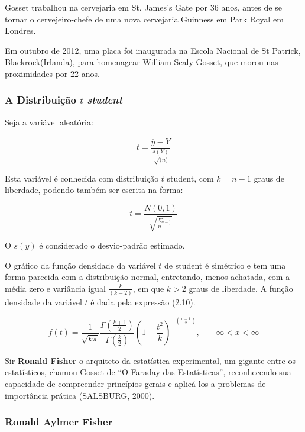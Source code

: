 Gosset trabalhou na cervejaria em St. James's Gate por 36 anos, antes de se tornar o cervejeiro-chefe de uma nova cervejaria Guinness em Park Royal em Londres.\vskip0.3cm

Em outubro de 2012, uma placa foi inaugurada na Escola Nacional de St Patrick, Blackrock(Irlanda), para homenagear William Sealy Gosset, que morou nas proximidades por 22 anos. \vskip0.3cm



\newpage
\subsubsection{A Distribuição $t$ \textit{student}}

Seja a variável aleatória:

\begin{equation}
    t =\frac{\overline{y}-\overline{Y}}{\frac{s(Y)}{\sqrt(n)}}
\end{equation}

Esta variável é conhecida com distribuição $t$ student, com $k=n-1$ graus de liberdade, podendo também ser escrita na forma:

\begin{equation}
    t =\frac{N(0,1)}{\sqrt{\frac{\chi^{2}_{n-1}}{n-1}}}
\end{equation}

O $s(y)$ é considerado o desvio-padrão estimado.\vskip0.3cm

O gráfico da função densidade da variável $t$ de student é simétrico e tem uma forma parecida com a distribuição normal, entretando, menos achatada, com a média zero e variância igual $\frac{k}{(k-2)}$, em que $k>2$ graus de liberdade. A função densidade da variável $t$ é dada pela expressão (2.10). 

\begin{equation}
f\left(t\right)=\frac{1}{\sqrt{k \pi}}\frac{\Gamma\left(\frac{k+1}{2}\right) }{\Gamma \left(\frac{k}{2}\right)}\left(1+\frac{t^2}{k}\right)^{-\left(\frac{\upsilon+1}{2}\right)},~~~-\infty<x<\infty
\end{equation}

Sir \textbf{Ronald Fisher} o arquiteto da estatística experimental, um gigante entre os estatísticos, chamou Gosset de “O Faraday das Estatísticas”, reconhecendo sua capacidade de compreender princípios gerais e aplicá-los a problemas de importância prática (SALSBURG, 2000).


\newpage
\subsubsection{Ronald Aylmer Fisher}

